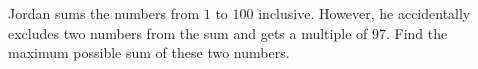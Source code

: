 Jordan sums the numbers from $1$ to $100$ inclusive. However, he accidentally excludes two numbers from the sum and gets a multiple of $97$. Find the maximum possible sum of these two numbers.
